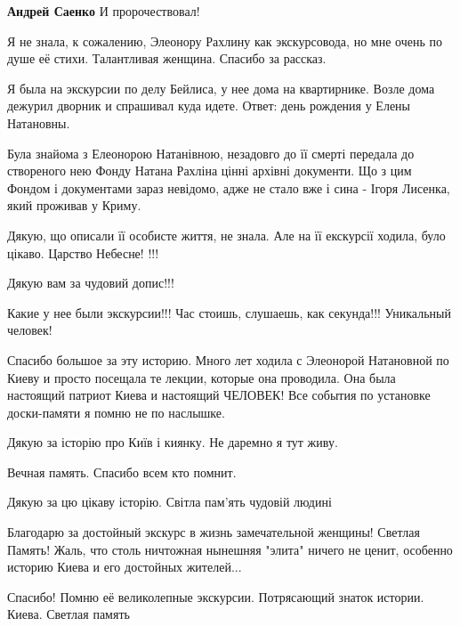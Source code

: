 \begin{itemize}
\begin{itemize}
\begin{itemize}
\textbf{Андрей Саенко} И пророчествовал!
\end{itemize} %

\end{itemize} %


Я не знала, к сожалению, Элеонору Рахлину как экскурсовода, но мне очень по
душе её стихи. Талантливая женщина. Спасибо за рассказ.


Я была на экскурсии по делу Бейлиса, у нее дома на квартирнике. Возле дома
дежурил дворник и спрашивал куда идете. Ответ: день рождения у Елены Натановны.


Була знайома з Елеонорою Натанівною, незадовго до її смерті передала до
створеного нею Фонду Натана Рахліна цінні архівні документи. Що з цим Фондом і
документами зараз невідомо, адже не стало вже і сина - Ігоря Лисенка, який
проживав у Криму.

Дякую, що описали її особисте життя, не знала.
Але на її екскурсії ходила, було цікаво.
Царство Небесне! !!!

Дякую вам за чудовий допис!!!

Какие у нее были экскурсии!!! Час стоишь, слушаешь, как секунда!!! Уникальный человек!


Спасибо большое за эту историю. Много лет ходила с Элеонорой Натановной по
Киеву и просто посещала те лекции, которые она проводила. Она была настоящий
патриот Киева и настоящий ЧЕЛОВЕК! Все события по установке доски-памяти я
помню не по наслышке.

Дякую за історію про Київ і киянку. Не даремно я тут живу.

Вечная память. Спасибо всем кто помнит.

Дякую за цю цікаву історію. Світла пам'ять чудовій людині


Благодарю за достойный экскурс в жизнь замечательной женщины! Светлая Память!
Жаль, что столь ничтожная нынешняя "элита" ничего не ценит, особенно историю
Киева и его достойных жителей...


Спасибо! Помню её великолепные экскурсии. Потрясающий знаток истории. Киева.
Светлая память


\end{itemize}
